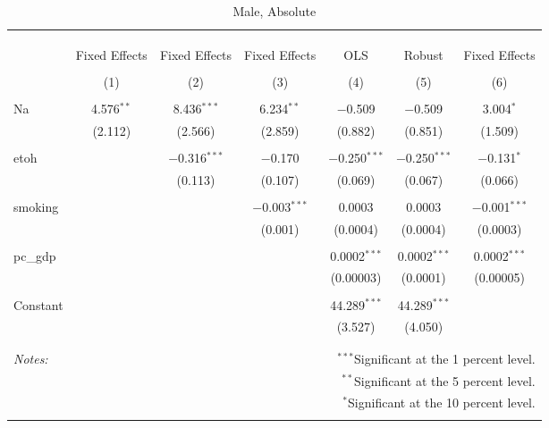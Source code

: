 \documentclass[11pt]{article}\usepackage[]{graphicx}\usepackage[]{color}
\begin{document}
\begin{table}[!htbp] \centering 
  \caption{Male, Absolute} 
  \label{} 
\begin{tabular}{@{\extracolsep{5pt}}lcccccc} 
\\[-1.8ex]\hline 
\hline \\[-1.8ex] 
\\[-1.8ex] & \multicolumn{6}{c}{ } \\ 
 & Fixed Effects & Fixed Effects & Fixed Effects & OLS & Robust & Fixed Effects \\ 
\\[-1.8ex] & (1) & (2) & (3) & (4) & (5) & (6)\\ 
\hline \\[-1.8ex] 
 Na & 4.576$^{**}$ & 8.436$^{***}$ & 6.234$^{**}$ & $-$0.509 & $-$0.509 & 3.004$^{*}$ \\ 
  & (2.112) & (2.566) & (2.859) & (0.882) & (0.851) & (1.509) \\ 
  & & & & & & \\ 
 etoh &  & $-$0.316$^{***}$ & $-$0.170 & $-$0.250$^{***}$ & $-$0.250$^{***}$ & $-$0.131$^{*}$ \\ 
  &  & (0.113) & (0.107) & (0.069) & (0.067) & (0.066) \\ 
  & & & & & & \\ 
 smoking &  &  & $-$0.003$^{***}$ & 0.0003 & 0.0003 & $-$0.001$^{***}$ \\ 
  &  &  & (0.001) & (0.0004) & (0.0004) & (0.0003) \\ 
  & & & & & & \\ 
 pc\_gdp &  &  &  & 0.0002$^{***}$ & 0.0002$^{***}$ & 0.0002$^{***}$ \\ 
  &  &  &  & (0.00003) & (0.0001) & (0.00005) \\ 
  & & & & & & \\ 
 Constant &  &  &  & 44.289$^{***}$ & 44.289$^{***}$ &  \\ 
  &  &  &  & (3.527) & (4.050) &  \\ 
  & & & & & & \\ 
\hline 
\hline \\[-1.8ex] 
\textit{Notes:} & \multicolumn{6}{r}{$^{***}$Significant at the 1 percent level.} \\ 
 & \multicolumn{6}{r}{$^{**}$Significant at the 5 percent level.} \\ 
 & \multicolumn{6}{r}{$^{*}$Significant at the 10 percent level.} \\ 
 & \multicolumn{6}{r}{} \\ 
\end{tabular} 
\end{table} 
\end{document}
